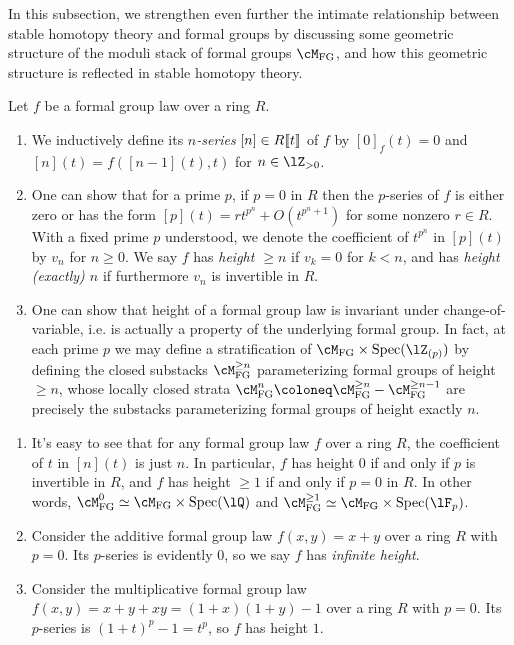 In this subsection, we strengthen even further the intimate
relationship between stable homotopy theory and formal groups by
discussing some geometric structure of the moduli stack of formal
groups $\cM_\FG$, and how this geometric structure is reflected in
stable homotopy theory.

\begin{definitions}
  \label{chrom-nseries}
  Let $f$ be a formal group law over a ring $R$.
  \begin{enumerate}[leftmargin=*]
  \item We inductively define its \emph{$n$-series}
    $[n] \in R \llbracket t \rrbracket$ of $f$ by $[0]_f(t) = 0$ and
    $[n](t) = f([n-1](t), t)$ for $n \in \lZ_{> 0}$.
  \item One can show that for a prime $p$, if $p=0$ in $R$ then the
    $p$-series of $f$ is either zero or has the form
    $[p](t) = rt^{p^n} + O(t^{p^n+1})$ for some nonzero $r \in R$.
    With a fixed prime $p$ understood, we denote the coefficient of
    $t^{p^n}$ in $[p](t)$ by $v_n$ for $n \ge 0$. We say $f$ has
    \emph{height $\ge n$} if $v_k = 0$ for $k < n$, and has
    \emph{height (exactly) $n$} if furthermore $v_n$ is invertible in
    $R$.
  \item One can show that height of a formal group law is invariant
    under change-of-variable, i.e. is actually a property of the
    underlying formal group. In fact, at each prime $p$ we may define
    a stratification of $\cM_\FG \times \Spec(\lZ_{(p)})$ by defining
    the closed substacks $\cM_\FG^{\ge n}$ parameterizing formal
    groups of height $\ge n$, whose locally closed strata
    $\cM_\FG^n \ce \cM_\FG^{\ge n} - \cM_\FG^{\ge n-1}$ are precisely
    the substacks parameterizing formal groups of height exactly $n$.
  \end{enumerate}
\end{definitions}

\begin{examples}
  \label{chrom-htex}
  \begin{enumerate}[leftmargin=*]
  \item It's easy to see that for any formal group law $f$ over a ring
    $R$, the coefficient of $t$ in $[n](t)$ is just $n$. In
    particular, $f$ has height $0$ if and only if $p$ is invertible in
    $R$, and $f$ has height $\ge 1$ if and only if $p = 0$ in $R$. In
    other words, $\cM_\FG^0 \iso \cM_\FG \times \Spec(\lQ)$ and
    $\cM_\FG^{\ge 1} \iso \cM_\FG \times \Spec(\lF_p)$.
  \item Consider the additive formal group law $f(x,y) = x + y$ over a
    ring $R$ with $p=0$. Its $p$-series is evidently $0$, so we say
    $f$ has \emph{infinite height}.
  \item Consider the multiplicative formal group law
    $f(x,y) = x + y + xy = (1+x)(1+y) - 1$ over a ring $R$ with
    $p=0$. Its $p$-series is $(1+t)^p - 1 = t^p$, so $f$ has height
    $1$.
  \end{enumerate}
\end{examples}


